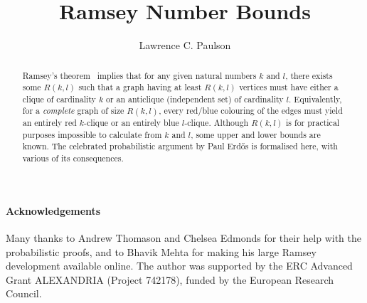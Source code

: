 \documentclass[11pt,a4paper]{article}
\begin{document}
\title{Ramsey Number Bounds}
\author{Lawrence C. Paulson}
\maketitle

\begin{abstract}
Ramsey's theorem~\cite{bollobas-graph-theory} implies that for any given natural numbers $k$ and $l$, there exists some $R(k,l)$
such that a graph having at least $R(k,l)$ vertices must have either a clique of cardinality $k$
or an anticlique (independent set) of cardinality $l$. Equivalently, for a \emph{complete} graph of size $R(k,l)$,
every red/blue colouring of the edges must yield an entirely red $k$-clique or an entirely blue $l$-clique.
Although $R(k,l)$ is for practical purposes impossible to calculate from $k$ and $l$, 
some upper and lower bounds are known. The celebrated probabilistic argument by Paul Erd\H{o}s is 
formalised here, with various of its consequences.
\end{abstract}

\newpage
\tableofcontents

\paragraph*{Acknowledgements}
Many thanks to Andrew Thomason and Chelsea Edmonds for their help with the probabilistic proofs,
and to Bhavik Mehta for making his large Ramsey development available online.
The author was supported by the ERC Advanced Grant ALEXANDRIA (Project 742178), funded by the European Research Council. 

\newpage





\end{document}
